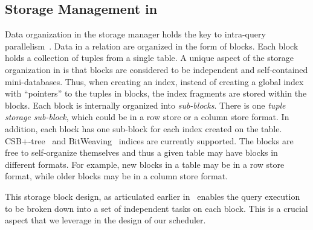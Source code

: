 \subsection{Storage Management in \sys{}}\label{ssec:storage-manager}
Data organization in the \sys{} storage manager holds the key to intra-query 
parallelism~\cite{qsstorage}. 
Data in a relation are organized in the form of blocks. 
Each block holds a collection of tuples from a single table. 
A unique aspect of the storage organization in \sys{} is that blocks are considered to 
be independent and self-contained mini-databases. 
Thus, when creating an index, instead of creating a global index with 
``pointers'' to the tuples in blocks, the index fragments are stored within the blocks. 
Each block is internally organized into \textit{sub-blocks}. 
There is one \textit{tuple storage sub-block}, which could be in a row store or a 
column store format.
In addition, each block has one sub-block for each index created on the table. 
CSB+-tree~\cite{csb+-tree} and BitWeaving~\cite{bitweaving} 
indices are currently supported. 
The blocks are free to self-organize themselves and thus a given table may have blocks in different formats. 
For example, new blocks in a table may be in a row store format, while older blocks may 
be in a column store format.

This storage block design, as articulated earlier in~\cite{qsstorage} enables the query execution to be broken down into a set of independent tasks on each block. 
This is a crucial aspect that we leverage in the design of our scheduler. 

